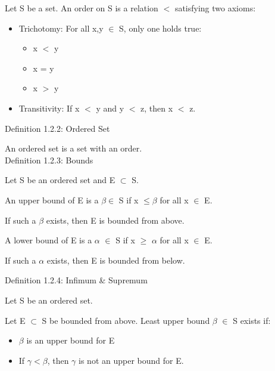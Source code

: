 	\hspace{1cm}
	Let S be a set. An order on S is a relation $<$ satisfying two axioms:

	\begin{itemize}[leftmargin=2cm, itemsep=0.1cm]
		\item { \color{lblue} Trichotomy}: For all x,y $ \in $ S, only one holds true:
			\begin{itemize}[leftmargin=1cm, itemsep=0.1cm]
				\item x $<$ y
				\item x = y
				\item x $>$ y
			\end{itemize}
		\item { \color{lblue} Transitivity}: If x $<$ y and y $<$ z, then x $<$ z. \\
	\end{itemize}

{ \color{blue} Definition 1.2.2: Ordered Set }

	\hspace{1cm}
	An ordered set is a set with an order. \\

{ \color{blue} Definition 1.2.3: Bounds }

	\begin{adjustbox}{minipage=14cm, right, vspace=0.1cm 0cm}
		Let S be an ordered set and E $ \subset $ S.

		An upper bound of E is a $ \beta \in $ S if x $ \leq \beta $
		for all x $ \in $ E.

		\hspace{1cm}
		If such a $ \beta $ exists, then E is bounded from above.

		A lower bound of E is a $\alpha$ $\in$ S if x $ \geq $ $\alpha$
		for all x $\in$ E.

		\hspace{1cm}
		If such a $\alpha$ exists, then E is bounded from below.
	\end{adjustbox}

\newpage

{ \color{blue} Definition 1.2.4: Infimum \& Supremum}

	\hspace{1cm}
	Let S be an ordered set.

	\hspace{1cm}
	Let E $ \subset $ S be bounded from above.
	Least upper bound $\beta$ $\in$ S exists if:
	
	\begin{itemize}[leftmargin=2cm, itemsep=0.1cm]
		\item $\beta$ is an upper bound for E
	
		\item If $\gamma < \beta$, then $ \gamma $ is not an upper bound for E.
	\end{itemize}

